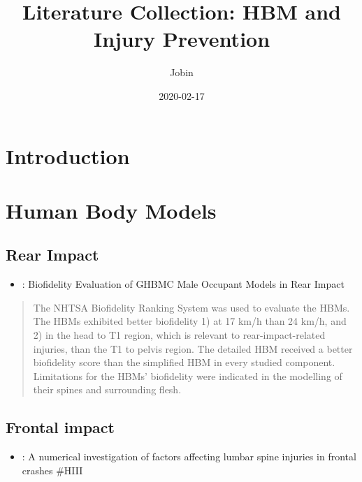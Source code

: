 \documentclass[]{book}
\title{Literature Collection: HBM and Injury Prevention}
\author{Jobin}
\date{2020-02-17}
\providecommand{\tightlist}{%
  \setlength{\itemsep}{0pt}\setlength{\parskip}{0pt}}
\begin{document}
\maketitle

{
\setcounter{tocdepth}{1}
\tableofcontents
}
\hypertarget{introduction}{%
\chapter{Introduction}\label{introduction}}

\hypertarget{human-body-models}{%
\chapter{Human Body Models}\label{human-body-models}}

\hypertarget{rear-impact}{%
\section{Rear Impact}\label{rear-impact}}

\begin{itemize}
\tightlist
\item
  \citet{Katagiri2019}: Biofidelity Evaluation of GHBMC Male Occupant Models in Rear Impact
\end{itemize}

\begin{quote}
The NHTSA Biofidelity Ranking System was used to evaluate the HBMs. The HBMs exhibited better biofidelity 1) at 17 km/h than 24 km/h, and 2) in the head to T1 region, which is relevant to rear-impact-related injuries, than the T1 to pelvis region. The detailed HBM received a better biofidelity score than the simplified HBM in every studied component. Limitations for the HBMs' biofidelity were indicated in the modelling of their spines and surrounding flesh.
\end{quote}

\hypertarget{frontal-impact}{%
\section{Frontal impact}\label{frontal-impact}}

\begin{itemize}
\tightlist
\item
  \citet{Tang2020}: A numerical investigation of factors affecting lumbar spine injuries in frontal crashes \#HIII
\end{itemize}
\end{document}
